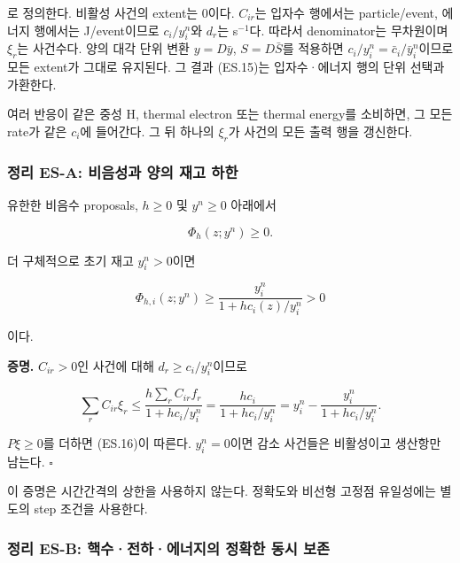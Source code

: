 \documentclass[11pt,a4paper]{article}
\begin{document}
로 정의한다. 비활성 사건의 extent는 0이다. \(C_{ir}\)는 입자수 행에서는 particle/event, 에너지 행에서는 J/event이므로 \(c_i/y_i^n\)와 \(d_r\)는 s\(^{-1}\)다. 따라서 denominator는 무차원이며 \(\xi_r\)는 사건수다. 양의 대각 단위 변환 \(y=D\bar y\), \(S=D\bar S\)를 적용하면 \(c_i/y_i^n=\bar c_i/\bar y_i^n\)이므로 모든 extent가 그대로 유지된다. 그 결과 (ES.15)는 입자수·에너지 행의 단위 선택과 가환한다.

여러 반응이 같은 중성 H, thermal electron 또는 thermal energy를 소비하면, 그 모든 rate가 같은 \(c_i\)에 들어간다. 그 뒤 하나의 \(\xi_r\)가 사건의 모든 출력 행을 갱신한다.

\hypertarget{uxc815uxb9ac-es-a-uxbe44uxc74cuxc131uxacfc-uxc591uxc758-uxc7acuxace0-uxd558uxd55c}{%
\subsubsection{정리 ES-A: 비음성과 양의 재고 하한}\label{uxc815uxb9ac-es-a-uxbe44uxc74cuxc131uxacfc-uxc591uxc758-uxc7acuxace0-uxd558uxd55c}}

유한한 비음수 proposals, \(h\ge0\) 및 \(y^n\ge0\) 아래에서

\[
\Phi_h(z;y^n)\ge0.
\]

더 구체적으로 초기 재고 \(y_i^n>0\)이면

\[
\boxed{
\Phi_{h,i}(z;y^n)\ge
\frac{y_i^n}{1+h c_i(z)/y_i^n}>0
}
\tag{ES.16}
\]

이다.

\textbf{증명.} \(C_{ir}>0\)인 사건에 대해 \(d_r\ge c_i/y_i^n\)이므로

\[
\sum_r C_{ir}\xi_r
\le
\frac{h\sum_rC_{ir}f_r}{1+h c_i/y_i^n}
=
\frac{h c_i}{1+h c_i/y_i^n}
=
y_i^n-\frac{y_i^n}{1+h c_i/y_i^n}.
\]

\(P\xi\ge0\)를 더하면 (ES.16)이 따른다. \(y_i^n=0\)이면 감소 사건들은 비활성이고 생산항만 남는다. \(\square\)

이 증명은 시간간격의 상한을 사용하지 않는다. 정확도와 비선형 고정점 유일성에는 별도의 step 조건을 사용한다.

\hypertarget{uxc815uxb9ac-es-b-uxd575uxc218uxc804uxd558uxc5d0uxb108uxc9c0uxc758-uxc815uxd655uxd55c-uxb3d9uxc2dc-uxbcf4uxc874}{%
\subsubsection{정리 ES-B: 핵수·전하·에너지의 정확한 동시 보존}\label{uxc815uxb9ac-es-b-uxd575uxc218uxc804uxd558uxc5d0uxb108uxc9c0uxc758-uxc815uxd655uxd55c-uxb3d9uxc2dc-uxbcf4uxc874}}
\end{document}
